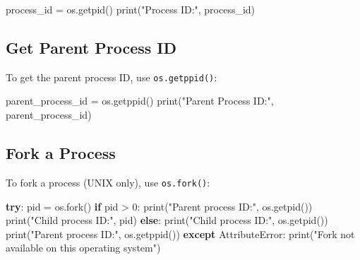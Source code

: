\documentclass[
  letterpaper,
  DIV=11,
  numbers=noendperiod]{scrreprt}
\newenvironment{Shaded}{\begin{snugshade}}{\end{snugshade}}
\newcommand{\BuiltInTok}[1]{\textcolor[rgb]{0.00,0.23,0.31}{#1}}
\newcommand{\ControlFlowTok}[1]{\textcolor[rgb]{0.00,0.23,0.31}{\textbf{#1}}}
\newcommand{\DecValTok}[1]{\textcolor[rgb]{0.68,0.00,0.00}{#1}}
\newcommand{\NormalTok}[1]{\textcolor[rgb]{0.00,0.23,0.31}{#1}}
\newcommand{\OperatorTok}[1]{\textcolor[rgb]{0.37,0.37,0.37}{#1}}
\newcommand{\PreprocessorTok}[1]{\textcolor[rgb]{0.68,0.00,0.00}{#1}}
\newcommand{\StringTok}[1]{\textcolor[rgb]{0.13,0.47,0.30}{#1}}
\begin{document}
\begin{Shaded}
\begin{Highlighting}[]
\NormalTok{process\_id }\OperatorTok{=}\NormalTok{ os.getpid()}
\BuiltInTok{print}\NormalTok{(}\StringTok{"Process ID:"}\NormalTok{, process\_id)}
\end{Highlighting}
\end{Shaded}

\subsection{Get Parent Process ID}\label{get-parent-process-id}

To get the parent process ID, use \texttt{os.getppid()}:

\begin{Shaded}
\begin{Highlighting}[]
\NormalTok{parent\_process\_id }\OperatorTok{=}\NormalTok{ os.getppid()}
\BuiltInTok{print}\NormalTok{(}\StringTok{"Parent Process ID:"}\NormalTok{, parent\_process\_id)}
\end{Highlighting}
\end{Shaded}

\subsection{Fork a Process}\label{fork-a-process}

To fork a process (UNIX only), use \texttt{os.fork()}:

\begin{Shaded}
\begin{Highlighting}[]
\ControlFlowTok{try}\NormalTok{:}
\NormalTok{    pid }\OperatorTok{=}\NormalTok{ os.fork()}
    \ControlFlowTok{if}\NormalTok{ pid }\OperatorTok{\textgreater{}} \DecValTok{0}\NormalTok{:}
        \BuiltInTok{print}\NormalTok{(}\StringTok{"Parent process ID:"}\NormalTok{, os.getpid())}
        \BuiltInTok{print}\NormalTok{(}\StringTok{"Child process ID:"}\NormalTok{, pid)}
    \ControlFlowTok{else}\NormalTok{:}
        \BuiltInTok{print}\NormalTok{(}\StringTok{"Child process ID:"}\NormalTok{, os.getpid())}
        \BuiltInTok{print}\NormalTok{(}\StringTok{"Parent process ID:"}\NormalTok{, os.getppid())}
\ControlFlowTok{except} \PreprocessorTok{AttributeError}\NormalTok{:}
    \BuiltInTok{print}\NormalTok{(}\StringTok{"Fork not available on this operating system"}\NormalTok{)}
\end{Highlighting}
\end{Shaded}
\end{document}
